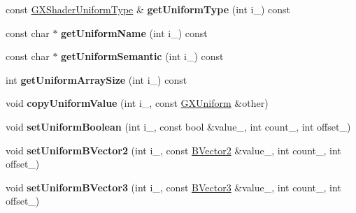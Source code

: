 \begin{DoxyCompactItemize}
\item 
const \hyperlink{class_i_dream_sky_1_1_g_x_shader_uniform_type}{G\+X\+Shader\+Uniform\+Type} \& {\bfseries get\+Uniform\+Type} (int i\+\_\+) const \hypertarget{class_i_dream_sky_1_1_g_x_shader_program_add392032da9ad36aab05bd3c3f8137ed}{}\label{class_i_dream_sky_1_1_g_x_shader_program_add392032da9ad36aab05bd3c3f8137ed}

\item 
const char $\ast$ {\bfseries get\+Uniform\+Name} (int i\+\_\+) const \hypertarget{class_i_dream_sky_1_1_g_x_shader_program_a5367332348b0c753d390a3f0c8940f14}{}\label{class_i_dream_sky_1_1_g_x_shader_program_a5367332348b0c753d390a3f0c8940f14}

\item 
const char $\ast$ {\bfseries get\+Uniform\+Semantic} (int i\+\_\+) const \hypertarget{class_i_dream_sky_1_1_g_x_shader_program_a556be1ab7deaab781c9b0050255cfce1}{}\label{class_i_dream_sky_1_1_g_x_shader_program_a556be1ab7deaab781c9b0050255cfce1}

\item 
int {\bfseries get\+Uniform\+Array\+Size} (int i\+\_\+) const \hypertarget{class_i_dream_sky_1_1_g_x_shader_program_a8d21004ff17f6e5685c4ea527dcffe04}{}\label{class_i_dream_sky_1_1_g_x_shader_program_a8d21004ff17f6e5685c4ea527dcffe04}

\item 
void {\bfseries copy\+Uniform\+Value} (int i\+\_\+, const \hyperlink{class_i_dream_sky_1_1_g_x_uniform}{G\+X\+Uniform} \&other)\hypertarget{class_i_dream_sky_1_1_g_x_shader_program_ab1b60c63f04da1badac7316f21fca7e0}{}\label{class_i_dream_sky_1_1_g_x_shader_program_ab1b60c63f04da1badac7316f21fca7e0}

\item 
void {\bfseries set\+Uniform\+Boolean} (int i\+\_\+, const bool \&value\+\_\+, int count\+\_, int offset\+\_)\hypertarget{class_i_dream_sky_1_1_g_x_shader_program_ae98e54ffdedaefaf08f13830b96b96d8}{}\label{class_i_dream_sky_1_1_g_x_shader_program_ae98e54ffdedaefaf08f13830b96b96d8}

\item 
void {\bfseries set\+Uniform\+B\+Vector2} (int i\+\_\+, const \hyperlink{class_i_dream_sky_1_1_b_vector2}{B\+Vector2} \&value\+\_\+, int count\+\_, int offset\+\_)\hypertarget{class_i_dream_sky_1_1_g_x_shader_program_ae4d90e632af9ae3c7d5ad8d93771fadf}{}\label{class_i_dream_sky_1_1_g_x_shader_program_ae4d90e632af9ae3c7d5ad8d93771fadf}

\item 
void {\bfseries set\+Uniform\+B\+Vector3} (int i\+\_\+, const \hyperlink{class_i_dream_sky_1_1_b_vector3}{B\+Vector3} \&value\+\_\+, int count\+\_, int offset\+\_)\hypertarget{class_i_dream_sky_1_1_g_x_shader_program_ad8ac8e93a5542b6cf0f6e8dc72bd4670}{}\label{class_i_dream_sky_1_1_g_x_shader_program_ad8ac8e93a5542b6cf0f6e8dc72bd4670}


\end{DoxyCompactItemize}
